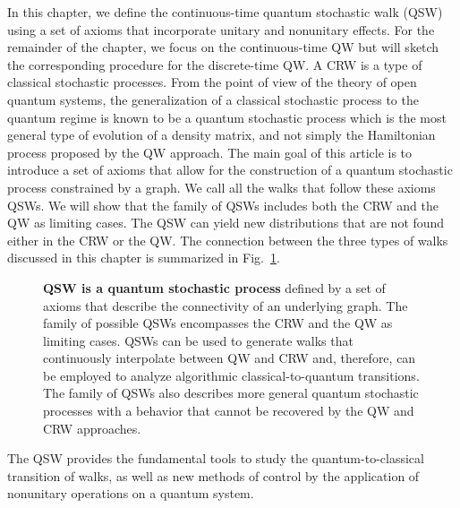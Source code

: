 \documentclass[11pt,oneside,final]{huthesis}%
\begin{document}
In this chapter, we define the continuous-time quantum stochastic walk (QSW) using a set
of axioms that incorporate unitary and nonunitary effects. For the remainder of the chapter, we focus on the continuous-time QW but will sketch the corresponding procedure for the discrete-time QW.  A CRW is a
type of classical stochastic processes. From the point of view of the theory of open quantum systems, the generalization of a classical stochastic process to the quantum
regime is known to be a quantum stochastic process
\cite{Sudarshan61,Kossakowski72,Lindblad76,
  Gorini76,Rodriguez08,Mohseni08} which is the most general type of evolution of a density matrix, and not simply the Hamiltonian
process proposed by the QW approach. The main goal of this article is to
introduce a set of axioms that allow for the construction of a quantum
stochastic process constrained by a graph. We call all the
walks that follow these axioms QSWs. We will show that the family of
QSWs includes both the CRW and the QW as limiting cases. The QSW can
yield new distributions that are not found either in the CRW or the QW. The connection
between the three types of walks discussed in this chapter is
summarized in Fig.~\ref{venn}.
\begin{figure}[htb]
\begin{center}
\end{center}  
\caption{\textbf{QSW is a quantum stochastic
  process} defined by a set of axioms that describe the connectivity of
  an underlying graph. The family of possible QSWs encompasses the
  CRW and the QW as limiting
  cases. QSWs can be used to generate walks that continuously
  interpolate between QW and CRW and, therefore, can be employed to
  analyze algorithmic classical-to-quantum transitions.  The family of
  QSWs also describes more general quantum stochastic processes with a
  behavior that cannot be recovered by the QW and CRW approaches.}
\label{venn}
\end{figure}
  The QSW provides
the fundamental tools to study the quantum-to-classical transition of
walks, as well as new methods of control by the application of
nonunitary operations on a quantum system.
\end{document}
